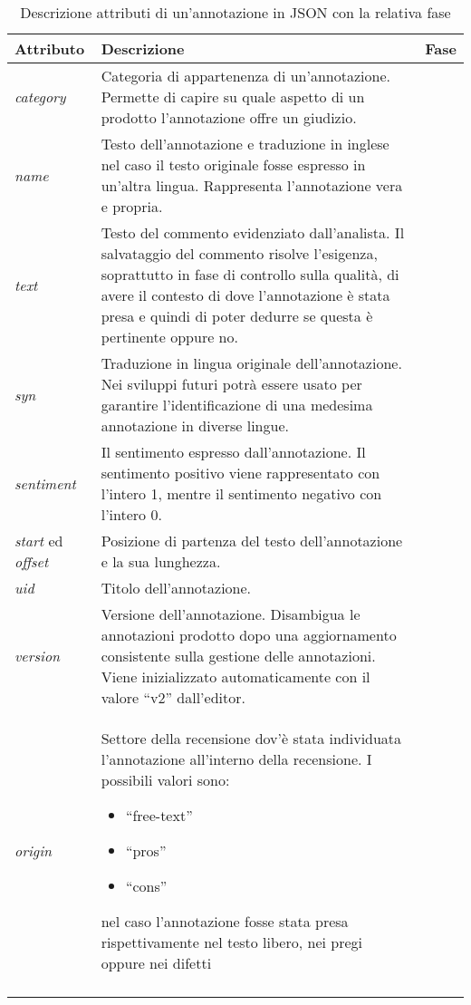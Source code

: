 \begin{center}
\begin{longtable}{|>{\centering}p{2.2cm}|p{8cm}|>{\centering}p{2.5cm}|}
\hline
\textbf{Attributo} & \textbf{Descrizione} & \textbf{Fase} \tabularnewline \hline
\textit{category} &
Categoria di appartenenza di un'annotazione. Permette di capire su quale
aspetto di un prodotto l'annotazione offre un giudizio. &
\nameref{catalogarla} \tabularnewline \hline
\textit{name} &
Testo dell'annotazione e traduzione in inglese nel caso il testo originale
fosse espresso in un'altra lingua. Rappresenta l'annotazione vera e propria. &
\nameref{riassumerla} \tabularnewline \hline
\textit{text} &
Testo del commento evidenziato dall'analista. Il salvataggio del commento
risolve l'esigenza, soprattutto in fase di controllo sulla qualità, di avere il
contesto di dove l'annotazione è stata presa e quindi di poter dedurre se questa
è pertinente oppure no. &
\nameref{evidenziarla} \tabularnewline \hline
\textit{syn} &
Traduzione in lingua originale dell'annotazione. Nei sviluppi futuri potrà
essere usato per garantire l'identificazione di una medesima annotazione in
diverse lingue. &
\nameref{riassumerla} \tabularnewline \hline
\textit{sentiment} &
Il sentimento espresso dall'annotazione. Il sentimento positivo viene
rappresentato con l'intero 1, mentre il sentimento negativo con l'intero 0. &
\nameref{sentimento} \tabularnewline \hline
\textit{start} ed \textit{offset} &
Posizione di partenza del testo dell'annotazione e la sua lunghezza. &
\nameref{evidenziarla} \tabularnewline \hline
\textit{uid} &
Titolo dell'annotazione. &
\nameref{intitolarla} \tabularnewline \hline
\textit{version} &
Versione dell'annotazione. Disambigua le annotazioni prodotto dopo una
aggiornamento consistente sulla gestione delle annotazioni. Viene inizializzato
automaticamente con il valore ``v2'' dall'editor. &
\nameref{salvarla} \tabularnewline\hline
\textit{origin} &
Settore della recensione dov'è stata individuata l'annotazione all'interno della
recensione. I possibili valori sono:
\begin{itemize}
\item ``free-text''
\item ``pros''
\item ``cons''
\end{itemize}
nel caso l'annotazione fosse stata presa rispettivamente nel testo libero, nei
pregi oppure nei difetti &
\nameref{evidenziarla} \tabularnewline \hline
\caption{Descrizione attributi di un'annotazione in JSON con la relativa fase}
\label{tab:attributi_annotazione}
\end{longtable}
\end{center}

